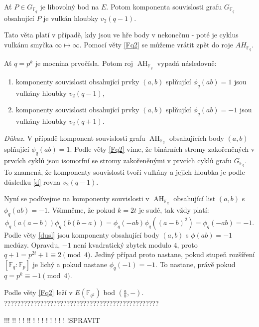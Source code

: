 \documentclass[12pt]{report}
\DeclareMathOperator{\AH}{AH}
\begin{document}
\begin{dusledek}\label{d}
Ať $P \in G_{\mathbb{F}_q}$ je libovolný bod na $E$. Potom komponenta souvislosti grafu $G_{\mathbb{F}_q}$ obsahující $P$ je vulkán hloubky $v_2(q-1)$.
\end{dusledek}

Tato věta platí v případě, kdy jsou ve hře body v nekonečnu - poté je cyklus vulkánu smyčka $\infty \longmapsto \infty$. Pomocí věty \ref{Fq2} se můžeme vrátit zpět do roje $AH_{\mathbb{F}_q}$.

\begin{veta}
Ať $q = p^k$ je mocnina prvočísla. Potom roj $\AH_{\mathbb{F}_q}$ vypadá následovně:
\begin{enumerate}
\item komponenty souvislosti obsahující prvky $(a,b)$ splňující $\phi_q (ab) = 1$ jsou vulkány hloubky $v_2(q-1)$,
\item komponenty souvislosti obsahující prvky $(a,b)$ splňující $\phi_q (ab) = -1$ jsou vulkány hloubky $v_2 (q+1)$.
\end{enumerate} 
\end{veta}

\noindent \textit{Důkaz.} V případě komponent souvislosti grafu $\AH_{\mathbb{F}_q}$ obsahujících body $(a,b)$ splňující $\phi_q(ab) = 1$. Podle věty \ref{Fq2} víme, že binárních stromy zakořeněných v prvcích cyklů jsou isomorfní se stromy zakořeněnými v prvcích cyklů grafu $G_{\mathbb{F}_q}$. To znamená, že komponenty souvislosti tvoří vulkány a jejich hloubka je podle důsledku \ref{d} rovna $v_2 (q-1)$. 

Nyní se podívejme na komponenty souvislosti v $\AH_{\mathbb{F}_q}$ obsahující list $(a,b)$ s $\phi_q(ab) = -1$. Všimněme, že pokud $k = 2t$ je sudé, tak vždy platí: $$\phi_q(a(a-b)) \phi_q(b(b-a)) =\phi_q(-ab) \phi_q((a-b)^2) = \phi_q(-ab) =-1.$$
Podle věty \ref{dusl} jsou komponenty obsahující body $(a,b)$ s $\phi(ab) = -1$ medúzy. Opravdu, $-1$ není kvadratický zbytek modulo $4$, proto $q + 1= p^{2t}+1 \equiv 2 \pmod{4}$. Jediný  případ proto nastane, pokud stupeň rozšíření $[\mathbb{F}_q : \mathbb{F}_p]$ je lichý a pokud nastane $\phi_q(-1) = -1$. To nastane, právě pokud $q=p^k \equiv  -1 \pmod{4}$.

Podle věty \ref{Fq2} leží v $E(\mathbb{F}_{q^2})$ bod $\left( \frac{a}{b},- \right)$.  ???????????????????????????????????????????????



!!! !! ! ! !! ! ! ! ! ! ! ! ! !SPRAVIT\\
\end{document}
